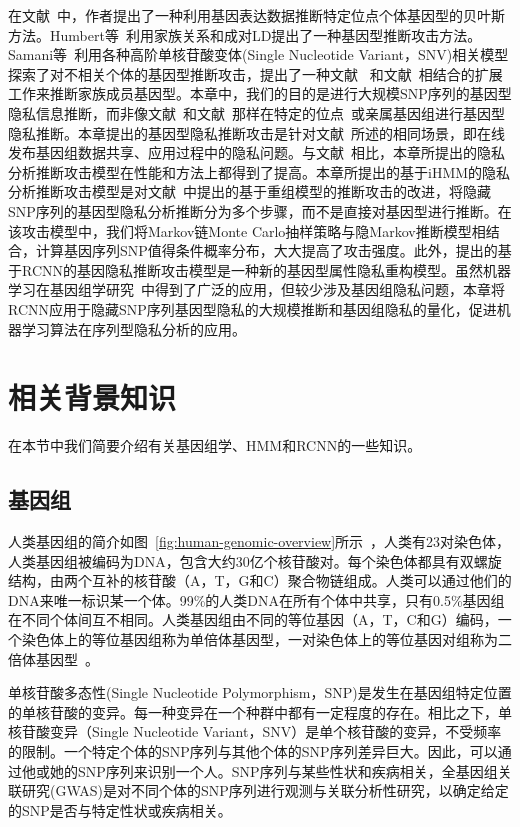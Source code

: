 在文献~\cite{schadt2012bayesian}中，作者提出了一种利用基因表达数据推断特定位点个体基因型的贝叶斯方法。Humbert等~\cite{humbert2013addressing}利用家族关系和成对LD提出了一种基因型推断攻击方法。Samani等~\cite{samani2015quantifying}利用各种高阶单核苷酸变体(Single Nucleotide Variant，SNV)相关模型探索了对不相关个体的基因型推断攻击，提出了一种文献~\cite{humbert2013addressing} 和文献~\cite{deznabi2018inference}相结合的扩展工作来推断家族成员基因型。本章中，我们的目的是进行大规模SNP序列的基因型隐私信息推断，而非像文献~\cite{humbert2013addressing}和文献~\cite{deznabi2018inference}那样在特定的位点~\cite{schadt2012bayesian}或亲属基因组进行基因型隐私推断。本章提出的基因型隐私推断攻击是针对文献~\cite{samani2015quantifying}所述的相同场景，即在线发布基因组数据共享、应用过程中的隐私问题。与文献~\cite{samani2015quantifying}相比，本章所提出的隐私分析推断攻击模型在性能和方法上都得到了提高。本章所提出的基于iHMM的隐私分析推断攻击模型是对文献~\cite{samani2015quantifying}中提出的基于重组模型的推断攻击的改进，将隐藏SNP序列的基因型隐私分析推断分为多个步骤，而不是直接对基因型进行推断。在该攻击模型中，我们将Markov链Monte Carlo抽样策略与隐Markov推断模型相结合，计算基因序列SNP值得条件概率分布，大大提高了攻击强度。此外，提出的基于RCNN的基因隐私推断攻击模型是一种新的基因型属性隐私重构模型。虽然机器学习在基因组学研究~\cite{libbrecht2015machine}中得到了广泛的应用，但较少涉及基因组隐私问题，本章将RCNN应用于隐藏SNP序列基因型隐私的大规模推断和基因组隐私的量化，促进机器学习算法在序列型隐私分析的应用。


\section{相关背景知识}\label{sec:back}

在本节中我们简要介绍有关基因组学、HMM和RCNN的一些知识。

\subsection{基因组}
人类基因组的简介如图~\ref{fig:human-genomic-overview}所示~\cite{samani2015quantifying}，人类有23对染色体，人类基因组被编码为DNA，包含大约30亿个核苷酸对。每个染色体都具有双螺旋结构，由两个互补的核苷酸（A，T，G和C）聚合物链组成。人类可以通过他们的DNA来唯一标识某一个体。99\%的人类DNA在所有个体中共享，只有0.5\%基因组在不同个体间互不相同。人类基因组由不同的等位基因（A，T，C和G）编码，一个染色体上的等位基因组称为单倍体基因型，一对染色体上的等位基因对组称为二倍体基因型~\cite{durbin1998biological}。

单核苷酸多态性(Single Nucleotide Polymorphism，SNP)是发生在基因组特定位置的单核苷酸的变异。每一种变异在一个种群中都有一定程度的存在。相比之下，单核苷酸变异（Single Nucleotide Variant，SNV）是单个核苷酸的变异，不受频率的限制。一个特定个体的SNP序列与其他个体的SNP序列差异巨大。因此，可以通过他或她的SNP序列来识别一个人。SNP序列与某些性状和疾病相关，全基因组关联研究(GWAS)是对不同个体的SNP序列进行观测与关联分析性研究，以确定给定的SNP是否与特定性状或疾病相关。

